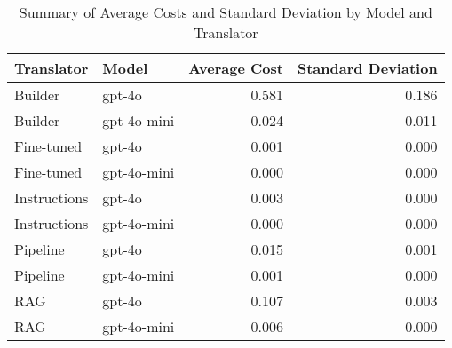 \begin{table}
\caption{Summary of Average Costs and Standard Deviation by Model and Translator}
\label{tab:average_cost_summary}
\begin{tabular}{llrr}
\toprule
Translator & Model & Average Cost & Standard Deviation \\
\midrule
Builder & gpt-4o & 0.581 & 0.186 \\
Builder & gpt-4o-mini & 0.024 & 0.011 \\
Fine-tuned & gpt-4o & 0.001 & 0.000 \\
Fine-tuned & gpt-4o-mini & 0.000 & 0.000 \\
Instructions & gpt-4o & 0.003 & 0.000 \\
Instructions & gpt-4o-mini & 0.000 & 0.000 \\
Pipeline & gpt-4o & 0.015 & 0.001 \\
Pipeline & gpt-4o-mini & 0.001 & 0.000 \\
RAG & gpt-4o & 0.107 & 0.003 \\
RAG & gpt-4o-mini & 0.006 & 0.000 \\
\bottomrule
\end{tabular}
\end{table}
